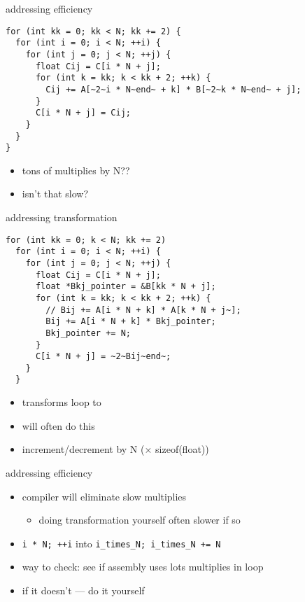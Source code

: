 \begin{frame}[fragile,label=addrEff]{addressing efficiency}
    \vspace{-.25cm}
\begin{lstlisting}
for (int kk = 0; kk < N; kk += 2) {
  for (int i = 0; i < N; ++i) {
    for (int j = 0; j < N; ++j) {
      float Cij = C[i * N + j];
      for (int k = kk; k < kk + 2; ++k) {
        Cij += A[~2~i * N~end~ + k] * B[~2~k * N~end~ + j];
      }
      C[i * N + j] = Cij;
    }
  }
}
\end{lstlisting}
\begin{itemize}
    \item tons of multiplies by N??
    \item isn't that slow?
\end{itemize}
\end{frame}

\begin{frame}[fragile,label=addrXform]{addressing transformation}
    \vspace{-.25cm}
\begin{lstlisting}
for (int kk = 0; k < N; kk += 2)
  for (int i = 0; i < N; ++i) {
    for (int j = 0; j < N; ++j) {
      float Cij = C[i * N + j];
      float *Bkj_pointer = &B[kk * N + j];
      for (int k = kk; k < kk + 2; ++k) {
        // Bij += A[i * N + k] * A[k * N + j~];
        Bij += A[i * N + k] * Bkj_pointer;
        Bkj_pointer += N;
      }
      C[i * N + j] = ~2~Bij~end~;
    }
  }
\end{lstlisting}
\begin{itemize}
    \item transforms loop to 
    \item {} will often do this 
    \item increment/decrement by N ($\times$ sizeof(float))
\end{itemize}
\end{frame}

\begin{frame}[fragile,label=addressEff]{addressing efficiency}
    \begin{itemize}
        \item compiler will  eliminate slow multiplies
            \begin{itemize}
            \item doing transformation yourself often slower if so
            \end{itemize}
        \item \lstinline|i * N; ++i| into \lstinline|i_times_N; i_times_N += N|
        \item way to check: see if assembly uses lots multiplies in loop
        \item if it doesn't --- do it yourself
    \end{itemize}
\end{frame}

